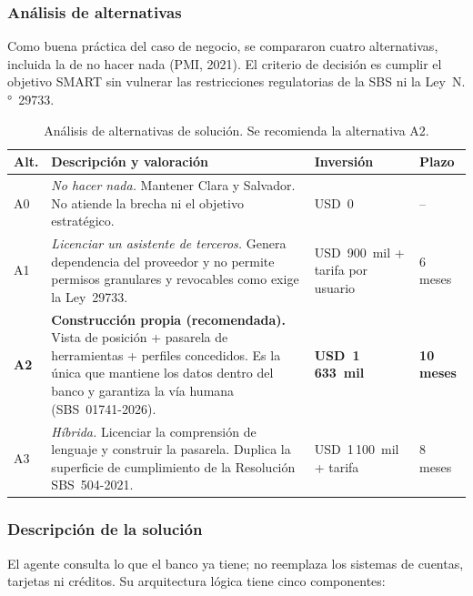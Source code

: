 \documentclass[11pt,a4paper]{article}
\newcommand{\usd}[1]{USD~#1}
\begin{document}
\subsubsection{Análisis de alternativas}

Como buena práctica del caso de negocio, se compararon cuatro alternativas, incluida la de no hacer nada (PMI, 2021). El criterio de decisión es cumplir el objetivo SMART sin vulnerar las restricciones regulatorias de la SBS ni la Ley~N.°~29733.

\begin{table}[H]
\centering
\caption{Análisis de alternativas de solución. Se recomienda la alternativa A2.}
\small
\begin{tabularx}{\textwidth}{@{}l X p{2.3cm} l@{}}
\toprule
\textbf{Alt.} & \textbf{Descripción y valoración} & \textbf{Inversión} & \textbf{Plazo} \\
\midrule
A0 & \textit{No hacer nada.} Mantener Clara y Salvador. No atiende la brecha ni el objetivo estratégico. & \usd{0} & -- \\
A1 & \textit{Licenciar un asistente de terceros.} Genera dependencia del proveedor y no permite permisos granulares y revocables como exige la Ley~29733. & \usd{900}~mil + tarifa por usuario & 6 meses \\
\rowcolor{suave} \textbf{A2} & \textbf{Construcción propia (recomendada).} Vista de posición + pasarela de herramientas + perfiles concedidos. Es la única que mantiene los datos dentro del banco y garantiza la vía humana (SBS~01741-2026). & \textbf{\usd{1\,633}~mil} & \textbf{10 meses} \\
A3 & \textit{Híbrida.} Licenciar la comprensión de lenguaje y construir la pasarela. Duplica la superficie de cumplimiento de la Resolución SBS~504-2021. & \usd{1\,100}~mil + tarifa & 8 meses \\
\bottomrule
\end{tabularx}
\end{table}

\subsubsection{Descripción de la solución}

El agente consulta lo que el banco ya tiene; no reemplaza los sistemas de cuentas, tarjetas ni créditos. Su arquitectura lógica tiene cinco componentes:
\end{document}
